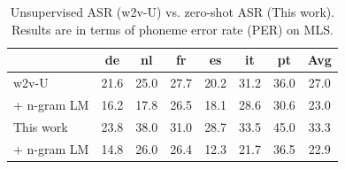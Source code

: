 \begin{table}[t]
\begin{center}
    
\caption{Unsupervised ASR (w2v-U) vs. zero-shot ASR (This work). Results are in terms of phoneme error rate (PER) on MLS.
\label{tab:mls_res}
}
\setlength{\tabcolsep}{5pt}
\begin{tabular}{@{}lcccccc|c@{}}
\toprule
            & de             & nl    & fr             & es             & it             & pt    & Avg \\ 
\midrule
w2v-U \cite{baevski2021unsupervised}      & 21.6          & 25.0 & 27.7          & 20.2          & 31.2          & 36.0 & 27.0 \\
+ n-gram LM                                           & 16.2          & 17.8 & 26.5          & 18.1          & 28.6          & 30.6 & 23.0 \\
\midrule
This work   & 23.8          & 38.0 & 31.0          & 28.7          & 33.5          & 45.0 & 33.3 \\
+ n-gram LM                                           & 14.8 & 26.0 & 26.4 & 12.3 & 21.7 & 36.5 & 22.9 \\ 
\bottomrule
\end{tabular}
\end{center}
\end{table}